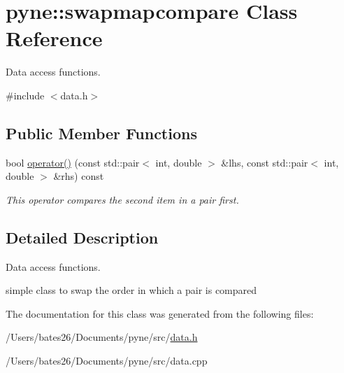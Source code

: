 \hypertarget{classpyne_1_1swapmapcompare}{\section{pyne\+:\+:swapmapcompare Class Reference}
\label{classpyne_1_1swapmapcompare}
}


Data access functions.  




{\ttfamily \#include $<$data.\+h$>$}

\subsection*{Public Member Functions}
\begin{DoxyCompactItemize}
\item 
\hypertarget{classpyne_1_1swapmapcompare_a766adfc375aa681d00aa60ac66a1fdd9}{bool \hyperlink{classpyne_1_1swapmapcompare_a766adfc375aa681d00aa60ac66a1fdd9}{operator()} (const std\+::pair$<$ int, double $>$ \&lhs, const std\+::pair$<$ int, double $>$ \&rhs) const }\label{classpyne_1_1swapmapcompare_a766adfc375aa681d00aa60ac66a1fdd9}

\begin{DoxyCompactList}\small\item\em This operator compares the second item in a pair first. \end{DoxyCompactList}\end{DoxyCompactItemize}


\subsection{Detailed Description}
Data access functions. 

simple class to swap the order in which a pair is compared 

The documentation for this class was generated from the following files\+:\begin{DoxyCompactItemize}
\item 
/\+Users/bates26/\+Documents/pyne/src/\hyperlink{data_8h}{data.\+h}\item 
/\+Users/bates26/\+Documents/pyne/src/data.\+cpp\end{DoxyCompactItemize}
